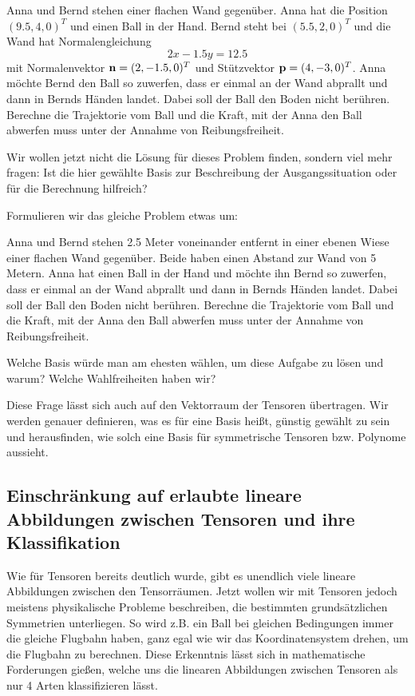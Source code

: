 \begin{gridmp}{\linewidth}
	{\selectfont
		Anna und Bernd stehen einer flachen Wand gegenüber. Anna hat die Position $(9.5, 4,0)^T$ und  einen Ball in der Hand. Bernd steht bei $(5.5, 2, 0)^T$ und die Wand hat Normalengleichung \[2x-1.5y = 12.5\] mit Normalenvektor $\mathbf{n}=(2,-1.5,0)^T$ und Stützvektor $\mathbf{p}=(4,-3,0)^T$. 
		Anna möchte Bernd den Ball so zuwerfen, dass er einmal an der Wand abprallt und dann in Bernds Händen landet. Dabei soll der Ball den Boden nicht berühren. Berechne die Trajektorie vom Ball und die Kraft, mit der Anna den Ball abwerfen muss unter der Annahme von Reibungsfreiheit.}
	\vspace{5cm}
\end{gridmp}
\medbreak
Wir wollen jetzt nicht die Lösung für dieses Problem finden, sondern viel mehr fragen: Ist die hier gewählte Basis zur Beschreibung der Ausgangssituation oder für die Berechnung hilfreich?

Formulieren wir das gleiche Problem etwas um:

\begin{gridmp}{\linewidth}
	{\selectfont
	Anna und Bernd stehen 2.5 Meter voneinander entfernt in einer ebenen Wiese einer flachen Wand gegenüber. Beide haben einen Abstand zur Wand von 5 Metern. Anna hat einen Ball in der Hand und möchte ihn Bernd so zuwerfen, dass er einmal an der Wand abprallt und dann in Bernds Händen landet. Dabei soll der Ball den Boden nicht berühren. Berechne die Trajektorie vom Ball und die Kraft, mit der Anna den Ball abwerfen muss unter der Annahme von Reibungsfreiheit.}
	\vspace{5cm}
\end{gridmp}
Welche Basis würde man am ehesten wählen, um diese Aufgabe zu lösen und warum? Welche Wahlfreiheiten haben wir?


Diese Frage lässt sich auch auf den Vektorraum der Tensoren übertragen. Wir werden genauer definieren, was es für eine Basis heißt, günstig gewählt zu sein und herausfinden, wie solch eine Basis für symmetrische Tensoren bzw. Polynome aussieht.

\subsection{Einschränkung auf erlaubte lineare Abbildungen zwischen Tensoren und ihre Klassifikation}
Wie für Tensoren bereits deutlich wurde, gibt es unendlich viele lineare Abbildungen zwischen den Tensorräumen. Jetzt wollen wir mit Tensoren jedoch meistens physikalische Probleme beschreiben, die bestimmten grundsätzlichen Symmetrien unterliegen. So wird z.B. ein Ball bei gleichen Bedingungen immer die gleiche Flugbahn haben, ganz egal wie wir das Koordinatensystem drehen, um die Flugbahn zu berechnen. Diese Erkenntnis lässt sich in mathematische Forderungen gießen, welche uns die linearen Abbildungen zwischen Tensoren als nur 4 Arten klassifizieren lässt.

